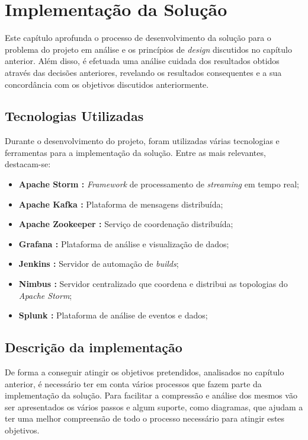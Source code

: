 \chapter{Implementação da Solução}
\label{sec:4-Implementacao}

Este capítulo aprofunda o processo de desenvolvimento da solução para o problema do projeto em 
análise e os princípios de \textit{design} discutidos no capítulo anterior. Além disso, é efetuada 
uma análise cuidada dos resultados obtidos através das decisões anteriores, revelando os resultados 
consequentes e a sua concordância com os objetivos discutidos anteriormente.

\section{Tecnologias Utilizadas}

Durante o desenvolvimento do projeto, foram utilizadas várias tecnologias e ferramentas para a 
implementação da solução. Entre as mais relevantes, destacam-se:

\begin{itemize}
  \item \textbf{Apache Storm \cite{storm}:} \textit{Framework} de processamento de 
    \textit{streaming} em tempo real;
  \item \textbf{Apache Kafka \cite{kafka}:} Plataforma de mensagens distribuída;
  \item \textbf{Apache Zookeeper \cite{zookeeper}:} Serviço de coordenação distribuída;
  \item \textbf{Grafana \cite{grafana}:} Plataforma de análise e visualização de dados;
  \item \textbf{Jenkins \cite{jenkins}:} Servidor de automação de \textit{builds}; 
  \item \textbf{Nimbus \cite{nimbus}:} Servidor centralizado que coordena e distribui as topologias 
    do \textit{Apache Storm};
  \item \textbf{Splunk \cite{splunk}:} Plataforma de análise de eventos e dados;
\end{itemize}

\section{Descrição da implementação}

De forma a conseguir atingir os objetivos pretendidos, analisados no capítulo anterior, é
necessário ter em conta vários processos que fazem parte da implementação da solução. Para 
facilitar a compressão e análise dos mesmos vão ser apresentados os vários passos e algum 
suporte, como diagramas, que ajudam a ter uma melhor compreensão de todo o processo necessário
para atingir estes objetivos.

